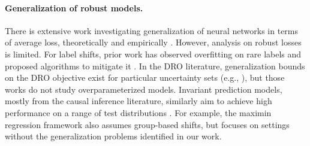 \paragraph{Generalization of robust models.}
There is extensive work investigating generalization of neural networks in terms of average loss,
theoretically and empirically \citep{hardt2016train,szegedy2016rethinking,hoffer2017train}.
However, analysis on robust losses is limited.
For label shifts, prior work has observed overfitting on rare labels
and proposed algorithms to mitigate it \citep{buda2018systematic,cui2019class,cao2019learning}.
In the DRO literature, generalization bounds on the DRO objective exist for particular uncertainty sets (e.g., \citet{duchi2018learning}), but those works do not study overparameterized models.
Invariant prediction models, mostly from the causal inference literature, similarly aim to achieve high performance on a range of test distributions
\citep{peters2016causal,buhlmann2016magging,heinze2017conditional,rothenhausler2018anchor,yang2019invariance,arjovsky2019invariant}. For example, the maximin regression framework \citep{meinshausen2015maximin} also assumes group-based shifts, but focuses on settings without the generalization problems identified in our work.
